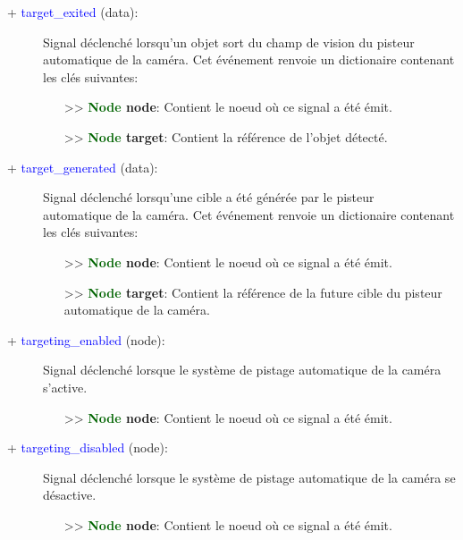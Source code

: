 \documentclass[a4paper, 11pt]{article}
\begin{document}
	\begin{description}
		\item [+ \textcolor{blue}{target\_exited} (data):] Signal déclenché lorsqu'un objet sort du champ de 
		vision du pisteur \\automatique de la caméra. Cet événement renvoie un dictionaire contenant les 
		clés suivantes:
		\begin{itemize}
			\item [>> \textbf{\textcolor{darkgreen}{Node} node}:] Contient le noeud où ce signal a été émit.
			\item [>> \textbf{\textcolor{darkgreen}{Node} target}:] Contient la référence de l'objet 
			détecté.\\
		\end{itemize}
	\end{description}
	\begin{description}
		\item [+ \textcolor{blue}{target\_generated} (data):] Signal déclenché lorsqu'une cible a été 
		générée par le pisteur \\automatique de la caméra. Cet événement renvoie un dictionaire contenant 
		les clés suivantes:
		\begin{itemize}
			\item [>> \textbf{\textcolor{darkgreen}{Node} node}:] Contient le noeud où ce signal a été émit.
			\item [>> \textbf{\textcolor{darkgreen}{Node} target}:] Contient la référence de la future cible
			du pisteur automatique de la caméra.\\
		\end{itemize}
	\end{description}
	\begin{description}
		\item [+ \textcolor{blue}{targeting\_enabled} (node):] Signal déclenché lorsque le système de 
		pistage automatique de la caméra s'active.
		\begin{itemize}
			\item [>> \textbf{\textcolor{darkgreen}{Node} node}:] Contient le noeud où ce signal a été émit.
			\\
		\end{itemize}
	\end{description}
	\begin{description}
		\item [+ \textcolor{blue}{targeting\_disabled} (node):] Signal déclenché lorsque le système de 
		pistage automatique de la caméra se désactive.
		\begin{itemize}
			\item [>> \textbf{\textcolor{darkgreen}{Node} node}:] Contient le noeud où ce signal a été émit.
			\\
		\end{itemize}
	\end{description}
\end{document}
